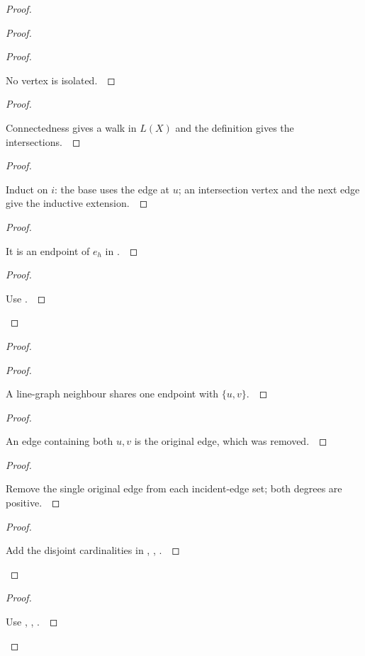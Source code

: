\documentclass[11pt]{amsart}
\let\qed\relax
\theoremstyle{definition}
\begin{document}
\begin{proof}
\begin{proof}
\begin{proof}
\pf\ \raggedright No vertex is isolated.~\qed
\end{proof}
\begin{proof}
\pf\ \raggedright Connectedness gives a walk in $L(X)$ and the definition gives the intersections.~\qed
\end{proof}
\begin{proof}
\pf\ \raggedright Induct on $i$: the base uses the edge at $u$; an intersection vertex and the next edge give the inductive extension.~\qed
\end{proof}
\begin{proof}
\pf\ \raggedright It is an endpoint of $e_h$ in .~\qed
\end{proof}
\qedstep
\begin{proof}
\pf\ \raggedright Use .~\qed
\end{proof}
\end{proof}
\begin{proof}
\begin{proof}
\pf\ \raggedright A line-graph neighbour shares one endpoint with $\{u,v\}$.~\qed
\end{proof}
\begin{proof}
\pf\ \raggedright An edge containing both $u,v$ is the original edge, which was removed.~\qed
\end{proof}
\begin{proof}
\pf\ \raggedright Remove the single original edge from each incident-edge set; both degrees are positive.~\qed
\end{proof}
\qedstep
\begin{proof}
\pf\ \raggedright Add the disjoint cardinalities in , , .~\qed
\end{proof}
\end{proof}
\qedstep
\begin{proof}
\pf\ \raggedright Use , , .~\qed
\end{proof}
\end{proof}
\end{document}
